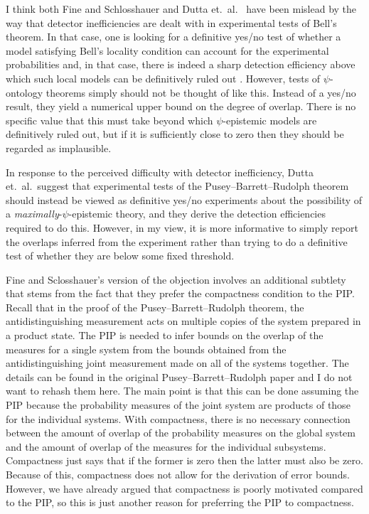 \documentclass[DIV=calc,paper=a4,fontsize=11pt,twocolumn]{scrartcl} %
\theoremstyle{definition}
\theoremstyle{plain}
\begin{document}
I think both Fine and Schlosshauer \cite{Schlosshauer2012} and Dutta
et.\ al.\ \cite{Dutta2014} have been mislead by the way that detector
inefficiencies are dealt with in experimental tests of Bell's theorem.
In that case, one is looking for a definitive yes/no test of whether a
model satisfying Bell's locality condition can account for the
experimental probabilities and, in that case, there is indeed a sharp
detection efficiency above which such local models can be definitively
ruled out \cite{Eberhard1993}.  However, tests of $\psi$-ontology
theorems simply should not be thought of like this.  Instead of a
yes/no result, they yield a numerical upper bound on the degree of
overlap.  There is no specific value that this must take beyond which
$\psi$-epistemic models are definitively ruled out, but if it is
sufficiently close to zero then they should be regarded as
implausible.

In response to the perceived difficulty with detector inefficiency,
Dutta et.\ al.\ suggest that experimental tests of the Pusey--Barrett--Rudolph theorem
should instead be viewed as definitive yes/no experiments about the
possibility of a \emph{maximally}-$\psi$-epistemic theory, and they
derive the detection efficiencies required to do this.  However, in my
view, it is more informative to simply report the overlaps inferred
from the experiment rather than trying to do a definitive test of
whether they are below some fixed threshold.

Fine and Sclosshauer's version of the objection involves an additional
subtlety that stems from the fact that they prefer the compactness
condition to the PIP\@.  Recall that in the proof of the Pusey--Barrett--Rudolph theorem,
the antidistinguishing measurement acts on multiple copies of the
system prepared in a product state.  The PIP is needed to infer bounds
on the overlap of the measures for a single system from the bounds
obtained from the antidistinguishing joint measurement made on all of
the systems together.  The details can be found in the original Pusey--Barrett--Rudolph
paper \cite{Pusey2012} and I do not want to rehash them here.  The
main point is that this can be done assuming the PIP because the
probability measures of the joint system are products of those for the
individual systems.  With compactness, there is no necessary
connection between the amount of overlap of the probability measures
on the global system and the amount of overlap of the measures for the
individual subsystems.  Compactness just says that if the former is
zero then the latter must also be zero.  Because of this, compactness
does not allow for the derivation of error bounds.  However, we have
already argued that compactness is poorly motivated compared to the
PIP, so this is just another reason for preferring the PIP to
compactness.
\end{document}
